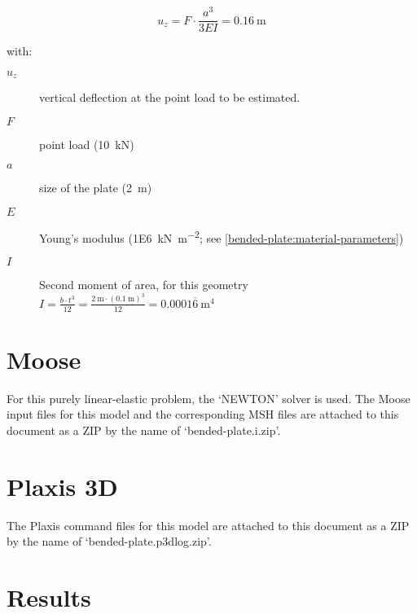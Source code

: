 \begin{equation}
    \label{bended-plate:analytical-solution}
    u_z = F \cdot \frac{a ^ 3}{3EI} = \qty{0.16}{\metre}
\end{equation}

\begin{samepage}
    with:
    \begin{description}
        \item[$u_{z}$] vertical deflection at the point load to be estimated.
        \item[$F$] point load (\qty{10}{\kilo\newton})
        \item[$a$] size of the plate (\qty{2}{\metre})
        \item[$E$] Young's modulus (\qty[per-mode = symbol]{1E6}{\kilo\newton\per\square\metre}; see \autoref{bended-plate:material-parameters})
        \item[$I$] Second moment of area, for this geometry $I = \frac{b \cdot t^3}{12} = \frac{\qty{2}{\metre} \cdot (\qty{0.1}{\metre})^3}{12} = 0.0001\overline{6} \qty{}{\metre}^4 $
    \end{description}
\end{samepage}

\section{Moose}
\label{bended-plate:sec:moose}

For this purely linear-elastic problem, the ‘NEWTON’ solver is used. The Moose
input files for this model and the corresponding MSH files are attached to this
document as a ZIP by the name of ‘bended-plate.i.zip’.


\section{Plaxis 3D}
\label{bended-plate:sec:plaxis3D}

The Plaxis command files for this model are attached to this document as a ZIP
by the name of ‘bended-plate.p3dlog.zip’.


\section{Results}
\label{bended-plate:sec:results}

